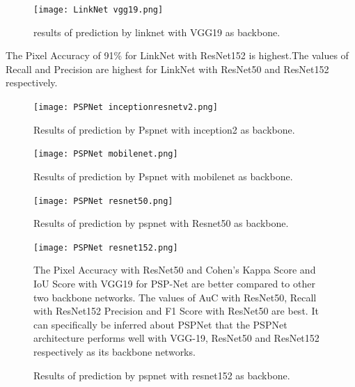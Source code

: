 \documentclass[a4paper,12pt]{spieman}  %
\begin{document}
\begin{spacing}{1}
\begin{figure}[!h]
\texttt{[image: LinkNet vgg19.png]}
   \caption{results of prediction by linknet with VGG19 as backbone.}
   \end{figure}
The Pixel Accuracy of 91\% for LinkNet with ResNet152 is highest.The values of Recall and Precision are highest for LinkNet with ResNet50 and ResNet152 respectively.
 \begin{figure}[!h]
	\centering
	\texttt{[image: PSPNet inceptionresnetv2.png]}
    \caption{Results of prediction by Pspnet with inception2 as backbone.}
    \texttt{[image: PSPNet mobilenet.png]}
    \caption{Results of prediction by Pspnet with mobilenet as backbone.}
 \texttt{[image: PSPNet resnet50.png]}
	\caption{\label{fig:}Results of prediction by pspnet  with Resnet50 as backbone.}
 \texttt{[image: PSPNet resnet152.png]}
   \caption{Results of prediction by pspnet with resnet152 as backbone.}
The Pixel Accuracy with ResNet50 and Cohen’s Kappa Score and IoU Score with VGG19 for PSP-Net are better compared to other two backbone networks. The values of AuC with ResNet50, Recall with ResNet152 Precision and F1 Score with ResNet50 are best. It can specifically be inferred about PSPNet that the PSPNet architecture performs well with VGG-19, ResNet50 and ResNet152 respectively as its backbone networks.

\end{figure}
\end{spacing}
\end{document}

